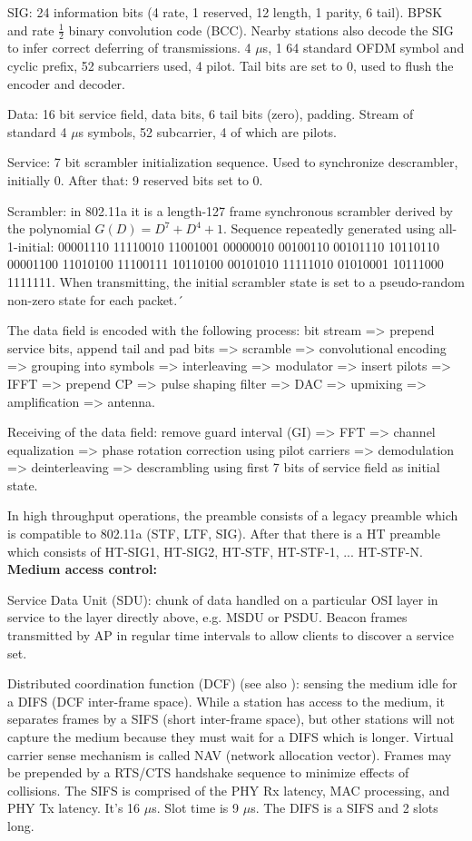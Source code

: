 SIG: 24 information bits (4 rate, 1 reserved, 12 length, 1 parity, 6 tail). BPSK and rate $\frac{1}{2}$ binary convolution code (BCC). Nearby stations also decode the SIG to infer correct deferring of transmissions. 4 $\mu$s, 1 64 standard OFDM symbol and cyclic prefix, 52 subcarriers used, 4 pilot. Tail bits are set to 0, used to flush the encoder and decoder.

Data: 16 bit service field, data bits, 6 tail bits (zero), padding. Stream of standard 4 $\mu$s symbols, 52 subcarrier, 4 of which are pilots.

Service: 7 bit scrambler initialization sequence. Used to synchronize descrambler, initially 0. After that: 9 reserved bits set to 0.

Scrambler: in 802.11a it is a length-127 frame synchronous scrambler derived by the polynomial $G(D)=D^7+D^4+1$. Sequence repeatedly generated using all-1-initial: 00001110 11110010 11001001 00000010 00100110 00101110 10110110 00001100 11010100 11100111 10110100 00101010 11111010 01010001 10111000 1111111. When transmitting, the initial scrambler state is set to a pseudo-random non-zero state for each packet.´

The data field is encoded with the following process: bit stream => prepend service bits, append tail and pad bits => scramble => convolutional encoding => grouping into symbols => interleaving => modulator => insert pilots => IFFT => prepend CP => pulse shaping filter => DAC => upmixing => amplification => antenna.

Receiving of the data field: remove guard interval (GI) => FFT => channel equalization => phase rotation correction using pilot carriers => demodulation => deinterleaving => descrambling using first 7 bits of service field as initial state.

In high throughput operations, the preamble consists of a legacy preamble which is compatible to 802.11a (STF, LTF, SIG). After that there is a HT preamble which consists of HT-SIG1, HT-SIG2, HT-STF, HT-STF-1, ... HT-STF-N.\\

\textbf{Medium access control:}

Service Data Unit (SDU): chunk of data handled on a particular OSI layer in service to the layer directly above, e.g. MSDU or PSDU. Beacon frames transmitted by AP in regular time intervals to allow clients to discover a service set.

Distributed coordination function (DCF) (see also \cite{bianchi2000}): sensing the medium idle for a DIFS (DCF inter-frame space). While a station has access to the medium, it separates frames by a SIFS (short inter-frame space), but other stations will not capture the medium because they must wait for a DIFS which is longer. Virtual carrier sense mechanism is called NAV (network allocation vector). Frames may be prepended by a RTS/CTS handshake sequence to minimize effects of collisions. The SIFS is comprised of the PHY Rx latency, MAC processing, and PHY Tx latency. It's 16 $\mu$s. Slot time is 9 $\mu$s. The DIFS is a SIFS and 2 slots long.

